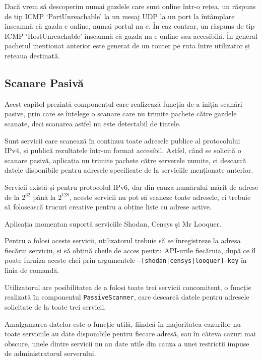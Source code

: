 	Dacă vrem să descoperim numai gazdele care sunt online într-o rețea, un răspuns de tip ICMP `PortUnreachable' la un mesaj UDP la un port la întâmplare înseamnă că gazda e online, numai portul nu e. În caz contrar, un răspuns de tip ICMP `HostUnreachable' înseamnă că gazda nu e online sau accesibilă. În general pachetul menționat anterior este generat de un router pe ruta între utilizator și rețeaua destinată.

\subsection*{Scanare Pasivă}

	Acest capitol prezintă componentul care realizează funcția de a iniția scanări pasive, prin care se înțelege o scanare care nu trimite pachete către gazdele scanate, deci scanarea astfel nu este detectabil de țintele.
	
	Sunt servicii care scanează în continuu toate adresele publice al protocolului IPv4, și publică rezultatele într-un format accesibil. Astfel, când se solicită o scanare pasivă, aplicația nu trimite pachete către serverele numite, ci descarcă datele disponibile pentru adresele specificate de la serviciile menționate anterior.
	
	Servicii există și pentru protocolul IPv6, dar din cauza numărului mărit de adrese de la $ 2^{32} $ până la $ 2^{128} $, aceste servicii nu pot să scaneze toate adresele, ci trebuie să folosească trucuri creative pentru a obține liste cu adrese active.
	
	Aplicația momentan suportă serviciile Shodan\cite{shodan16}, Censys\cite{censys15} și Mr Looquer\cite{looquer16}.
	
	Pentru a folosi aceste servicii, utilizatorul trebuie să se înregistreze la adresa fiecărui serviciu, și să obțină cheile de acces pentru API-urile fiecăruia, după ce îl poate furniza aceste chei prin argumentele \texttt{--[shodan|censys|looquer]-key} în linia de comandă.
	
	Utilizatorul are posibilitatea de a folosi toate trei servicii concomitent, o funcție realizată în componentul \texttt{PassiveScanner}, care descarcă datele pentru adresele solicitate de la toate trei servicii.
	
	Amalgamarea datelor este o funcție utilă, fiindcă în majoritatea cazurilor nu toate serviciile au date disponibile pentru fiecare adresă, sau în câteva cazuri mai obscure, unele dintre servicii nu au date utile din cauza a unei restricții impuse de administratorul serverului.


